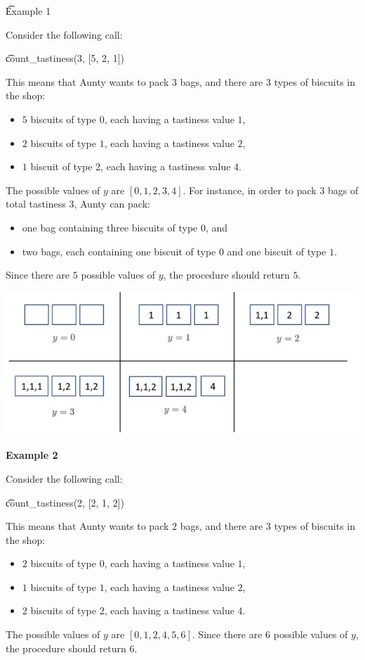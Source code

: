 \t{Example 1}

Consider the following call:

\t{count\_tastiness(3, [5, 2, 1])}

This means that Aunty wants to pack $3$ bags, and there are $3$ types of biscuits in the shop:
\begin{itemize}
\item $5$ biscuits of type $0$, each having a tastiness value $1$,
\item $2$ biscuits of type $1$, each having a tastiness value $2$,
\item $1$ biscuit of type $2$, each having a tastiness value $4$.
\end{itemize}

The possible values of $y$ are $[0, 1, 2, 3, 4]$. For instance, in order to pack $3$ bags of total tastiness $3$, Aunty can pack:
\begin{itemize}
 \item one bag containing three biscuits of type $0$, and
 \item two bags, each containing one biscuit of type $0$ and one biscuit of type $1$. 
\end{itemize}

Since there are $5$ possible values of $y$, the procedure should return $5$.

\includegraphics[scale=0.8]{1.png}

\textbf{Example 2}

Consider the following call:

\t{count\_tastiness(2, [2, 1, 2])}

This means that Aunty wants to pack $2$ bags, and there are $3$ types of biscuits in the shop:
\begin{itemize}
\item $2$ biscuits of type $0$, each having a tastiness value $1$,
\item $1$ biscuits of type $1$, each having a tastiness value $2$,
\item $2$ biscuits of type $2$, each having a tastiness value $4$.
\end{itemize}

The possible values of $y$ are $[0,1,2,4,5,6]$. Since there are $6$ possible values of $y$, the procedure should return $6$.

